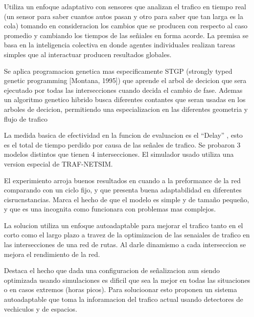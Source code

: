 \begin{itemize}
	\begin{item}
Utiliza un enfoque adaptativo con sensores que analizan el trafico en tiempo real (un sensor para saber cuantos autos pasan y otro para saber que tan larga es la cola) tomando en consideracion los cambios que se producen con respecto al caso promedio y cambiando los tiempos de las señiales en forma acorde.
La premisa se basa en la inteligencia colectiva en donde agentes individuales realizan tareas simples que al interactuar producen resultados globales.

Se aplica programacion genetica mas especificamente STGP (strongly typed genetic programming [Montana, 1995]) que aprende el arbol de decicion que sera ejecutado por todas las intersecciones cuando decida el cambio de fase. Ademas un algoritmo genetico hibrido busca diferentes contantes que seran usadas en los arboles de decicion, permitiendo una especializacion en las diferentes geometria y flujo de trafico

La medida basica de efectividad en la funcion de evaluacion es el “Delay” , esto es el total de tiempo perdido por causa de las señales de trafico. Se probaron 3 modelos distintos que tienen 4 intersecciones.
El simulador usado utiliza una version especial de TRAF-NETSIM.

El experimiento arroja buenos resultados en cuando a la preformance de la red comparando con un ciclo fijo, y que presenta buena adaptabilidad en diferentes cisrucnstancias. Marca el hecho de que el modelo es simple y de tamaño pequeño, y que es una incognita como funcionara con problemas mas complejos.
	
	\end{item}	


	\begin{item}
		\bibentry{Vogel2000}

La solucion utiliza un enfoque autoadaptable para mejorar el trafico tanto en el corto como el largo plazo a travez de la optimizacion de las senaiales de trafico en las intersecciones de una red de rutas. Al darle dinamismo a cada interseccion se mejora el rendimiento de la red.

Destaca el hecho que dada una configuracion de señalizacion aun siendo optimizada usando simulaciones es dificil que sea la mejor en todas las situaciones o en casos extremos (horas picos). Para solucioonar esto proponen un sistema autoadaptable que toma la inforamacion del trafico actual usando detectores de vechiculos y de espacios.


\end{item}
\end{itemize}
